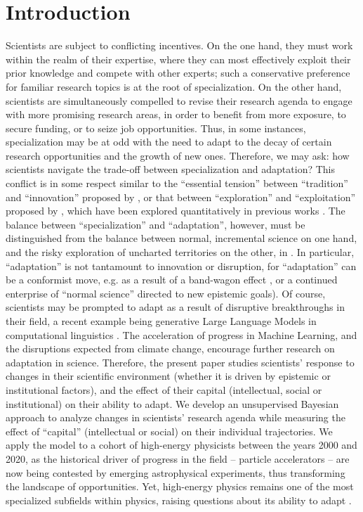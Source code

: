 \documentclass{article}
\begin{document}
\section{Introduction}

Scientists are subject to conflicting incentives. On the one hand, they must work within the realm of their expertise, where they can most effectively exploit their prior knowledge and compete with other experts; such a conservative preference for familiar research topics is at the root of specialization. On the other hand, scientists are simultaneously compelled to revise their research agenda to engage with more promising research areas, in order to benefit from more exposure, to secure funding, or to seize job opportunities. Thus, in some instances, specialization may be at odd with the need to adapt to the decay of certain research opportunities and the growth of new ones. Therefore, we may ask: how scientists navigate the trade-off between specialization and adaptation? This conflict is in some respect similar to the ``essential tension'' between ``tradition'' and ``innovation'' proposed by \citet{Kuhn1997}, or that between ``exploration'' and ``exploitation'' proposed by \citet{March1991}, which have been explored quantitatively in previous works \citep{Foster2015,Jia2017,Aleta2019,Zeng2019,Tripodi2020,Chakresh2023,Feifan2023}%
. The balance between ``specialization'' and ``adaptation'', however, must be distinguished from the balance between normal, incremental science on one hand, and the risky exploration of uncharted territories on the other, in \citet{Foster2015}. In particular, ``adaptation'' is not tantamount to innovation or disruption, for ``adaptation'' can be a conformist move, e.g. as a result of a band-wagon effect \citep{Fujimura1988}, or a continued enterprise of ``normal science'' directed to new epistemic goals). Of course, scientists may be prompted to adapt as a result of disruptive breakthroughs in their field, a recent example being generative Large Language Models in computational linguistics \citep{Naomi2023}. The acceleration of progress in Machine Learning, and the disruptions expected from climate change, encourage further research on adaptation in science. Therefore, the present paper studies scientists' response to changes in their scientific environment (whether it is driven by epistemic or institutional factors), and the effect of their capital (intellectual, social or institutional) on their ability to adapt. We develop an unsupervised Bayesian approach to analyze changes in scientists' research agenda while measuring the effect of ``capital'' (intellectual or social) on their individual trajectories. We apply the model to a cohort of high-energy physicists between the years 2000 and 2020, as the historical driver of progress in the field -- particle accelerators -- are now being contested by emerging astrophysical experiments, thus transforming the landscape of opportunities. Yet, high-energy physics remains one of the most specialized subfields within physics, raising questions about its ability to adapt \citep{Battiston2019,Aleta2019}.
\end{document}
